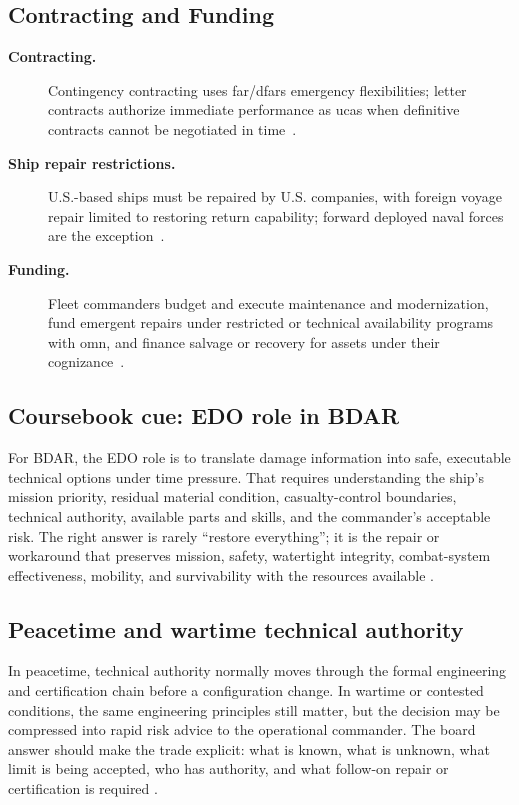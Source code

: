 \documentclass[../main.tex]{subfiles}
\begin{document}
\subsection{Contracting and Funding}
\begin{description}
  \item[\textbf{Contracting.}] Contingency contracting uses \ac{far}/\ac{dfars} emergency flexibilities; letter contracts authorize immediate performance as \acp{uca} when definitive contracts cannot be negotiated in time~\autocite{edo-4-1-6-bdar-2025}.
  \item[\textbf{Ship repair restrictions.}] U.S.-based ships must be repaired by U.S. companies, with foreign voyage repair limited to restoring return capability; forward deployed naval forces are the exception~\autocite{edo-4-1-6-bdar-2025}.
  \item[\textbf{Funding.}] Fleet commanders budget and execute maintenance and modernization, fund emergent repairs under restricted or technical availability programs with \ac{omn}, and finance salvage or recovery for assets under their cognizance~\autocite{edo-4-1-6-bdar-2025}.
\end{description}

\subsection{Coursebook cue: EDO role in BDAR}

For BDAR, the EDO role is to translate damage information into safe, executable
technical options under time pressure.  That requires understanding the ship's
mission priority, residual material condition, casualty-control boundaries,
technical authority, available parts and skills, and the commander's acceptable
risk.  The right answer is rarely ``restore everything''; it is the repair or
workaround that preserves mission, safety, watertight integrity, combat-system
effectiveness, mobility, and survivability with the resources available
\autocite{edo-4-1-6-bdar-2025}.

\subsection{Peacetime and wartime technical authority}

In peacetime, technical authority normally moves through the formal engineering
and certification chain before a configuration change.  In wartime or contested
conditions, the same engineering principles still matter, but the decision may
be compressed into rapid risk advice to the operational commander.  The board
answer should make the trade explicit: what is known, what is unknown, what
limit is being accepted, who has authority, and what follow-on repair or
certification is required
\autocite{edo-4-1-6-bdar-2025}.
\end{document}
